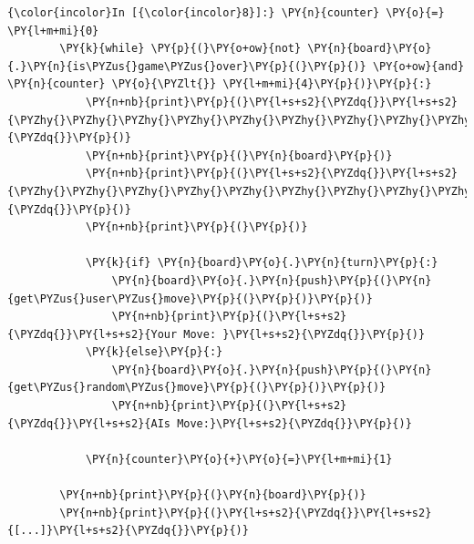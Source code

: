     \begin{Verbatim}[commandchars=\\\{\}]
{\color{incolor}In [{\color{incolor}8}]:} \PY{n}{counter} \PY{o}{=} \PY{l+m+mi}{0}
        \PY{k}{while} \PY{p}{(}\PY{o+ow}{not} \PY{n}{board}\PY{o}{.}\PY{n}{is\PYZus{}game\PYZus{}over}\PY{p}{(}\PY{p}{)} \PY{o+ow}{and} \PY{n}{counter} \PY{o}{\PYZlt{}} \PY{l+m+mi}{4}\PY{p}{)}\PY{p}{:}
            \PY{n+nb}{print}\PY{p}{(}\PY{l+s+s2}{\PYZdq{}}\PY{l+s+s2}{\PYZhy{}\PYZhy{}\PYZhy{}\PYZhy{}\PYZhy{}\PYZhy{}\PYZhy{}\PYZhy{}\PYZhy{}\PYZhy{}\PYZhy{}\PYZhy{}\PYZhy{}\PYZhy{}\PYZhy{}}\PY{l+s+s2}{\PYZdq{}}\PY{p}{)}
            \PY{n+nb}{print}\PY{p}{(}\PY{n}{board}\PY{p}{)}
            \PY{n+nb}{print}\PY{p}{(}\PY{l+s+s2}{\PYZdq{}}\PY{l+s+s2}{\PYZhy{}\PYZhy{}\PYZhy{}\PYZhy{}\PYZhy{}\PYZhy{}\PYZhy{}\PYZhy{}\PYZhy{}\PYZhy{}\PYZhy{}\PYZhy{}\PYZhy{}\PYZhy{}\PYZhy{}}\PY{l+s+s2}{\PYZdq{}}\PY{p}{)}
            \PY{n+nb}{print}\PY{p}{(}\PY{p}{)}
            
            \PY{k}{if} \PY{n}{board}\PY{o}{.}\PY{n}{turn}\PY{p}{:}
                \PY{n}{board}\PY{o}{.}\PY{n}{push}\PY{p}{(}\PY{n}{get\PYZus{}user\PYZus{}move}\PY{p}{(}\PY{p}{)}\PY{p}{)}
                \PY{n+nb}{print}\PY{p}{(}\PY{l+s+s2}{\PYZdq{}}\PY{l+s+s2}{Your Move: }\PY{l+s+s2}{\PYZdq{}}\PY{p}{)}
            \PY{k}{else}\PY{p}{:}
                \PY{n}{board}\PY{o}{.}\PY{n}{push}\PY{p}{(}\PY{n}{get\PYZus{}random\PYZus{}move}\PY{p}{(}\PY{p}{)}\PY{p}{)}
                \PY{n+nb}{print}\PY{p}{(}\PY{l+s+s2}{\PYZdq{}}\PY{l+s+s2}{AIs Move:}\PY{l+s+s2}{\PYZdq{}}\PY{p}{)}
                
            \PY{n}{counter}\PY{o}{+}\PY{o}{=}\PY{l+m+mi}{1}
            
        \PY{n+nb}{print}\PY{p}{(}\PY{n}{board}\PY{p}{)}
        \PY{n+nb}{print}\PY{p}{(}\PY{l+s+s2}{\PYZdq{}}\PY{l+s+s2}{[...]}\PY{l+s+s2}{\PYZdq{}}\PY{p}{)}
\end{Verbatim}


